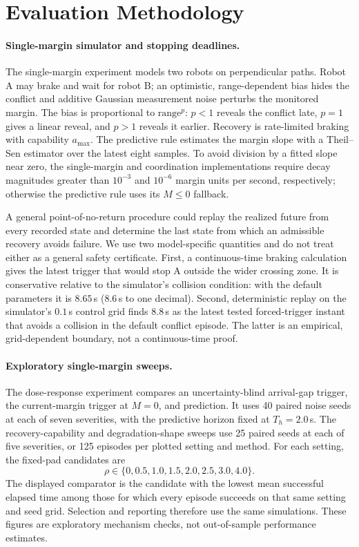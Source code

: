 \section{Evaluation Methodology}\label{sec:method}

\paragraph{Single-margin simulator and stopping deadlines.}
The single-margin experiment models two robots on perpendicular paths. Robot A may brake and wait for robot B; an optimistic, range-dependent bias hides the conflict and additive Gaussian measurement noise perturbs the monitored margin. The bias is proportional to $\mathrm{range}^{p}$: $p<1$ reveals the conflict late, $p=1$ gives a linear reveal, and $p>1$ reveals it earlier. Recovery is rate-limited braking with capability $a_{\max}$. The predictive rule estimates the margin slope with a Theil--Sen estimator over the latest eight samples. To avoid division by a fitted slope near zero, the single-margin and coordination implementations require decay magnitudes greater than $10^{-3}$ and $10^{-6}$ margin units per second, respectively; otherwise the predictive rule uses its $M\le0$ fallback.

A general point-of-no-return procedure could replay the realized future from every recorded state and determine the last state from which an admissible recovery avoids failure. We use two model-specific quantities and do not treat either as a general safety certificate. First, a continuous-time braking calculation gives the latest trigger that would stop A outside the wider crossing zone. It is conservative relative to the simulator's collision condition: with the default parameters it is $8.65$\,s ($8.6$\,s to one decimal). Second, deterministic replay on the simulator's $0.1$\,s control grid finds $8.8$\,s as the latest tested forced-trigger instant that avoids a collision in the default conflict episode. The latter is an empirical, grid-dependent boundary, not a continuous-time proof.

\paragraph{Exploratory single-margin sweeps.}
The dose-response experiment compares an uncertainty-blind arrival-gap trigger, the current-margin trigger at $M=0$, and prediction. It uses 40 paired noise seeds at each of seven severities, with the predictive horizon fixed at $T_h=2.0$\,s. The recovery-capability and degradation-shape sweeps use 25 paired seeds at each of five severities, or 125 episodes per plotted setting and method. For each setting, the fixed-pad candidates are
\[
  \rho\in\{0,0.5,1.0,1.5,2.0,2.5,3.0,4.0\}.
\]
The displayed comparator is the candidate with the lowest mean successful elapsed time among those for which every episode succeeds on that same setting and seed grid. Selection and reporting therefore use the same simulations. These figures are exploratory mechanism checks, not out-of-sample performance estimates.

